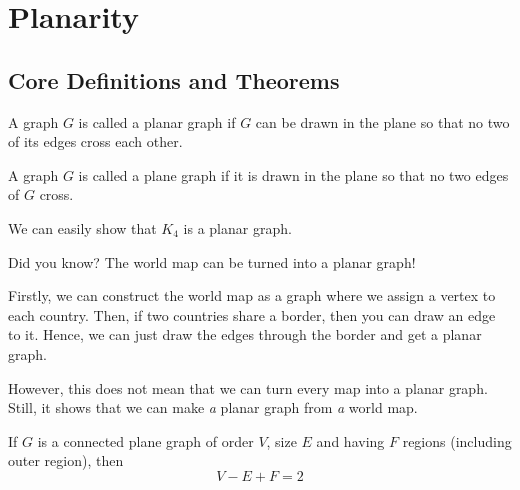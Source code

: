 \chapter{Planarity}

\section{Core Definitions and Theorems}

\begin{definition}
  A graph \(G\) is called a planar graph if \(G\) can be drawn in
  the plane so that no two of its edges cross each other.
\end{definition}

\begin{definition}
  A graph \(G\) is called a plane graph if it is drawn in the
  plane so that no two edges of \(G\) cross.
\end{definition}

\begin{nexample}
  We can easily show that \(K_{4}\) is a planar graph.
\end{nexample}

\begin{nexample}
  Did you know? The world map can be turned into a planar graph!
  
  Firstly, we can construct the world map as a graph where we
  assign a vertex to each country. Then, if two countries share a
  border, then you can draw an edge to it. Hence, we can just
  draw the edges through the border and get a planar graph.

  However, this does not mean that we can turn every map into a
  planar graph. Still, it shows that we can make \textit{a}
  planar graph from \textit{a} world map.
\end{nexample}

\begin{theorem}
  If \(G\) is a connected plane graph of order \(V\), size \(E\)
  and having \(F\) regions (including outer region), then
  \[ V-E+F=2 \]
\end{theorem}


